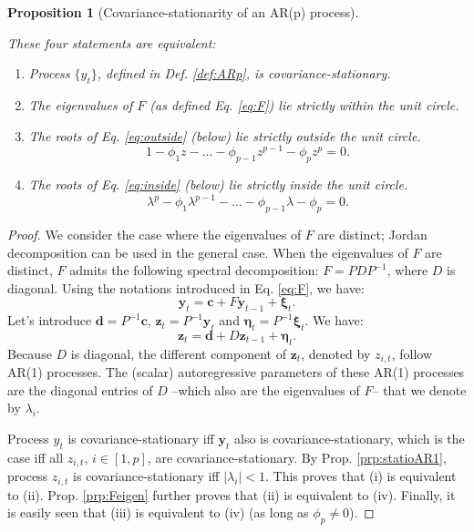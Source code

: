 \documentclass[
  12pt,
]{book}
\providecommand{\tightlist}{%
  \setlength{\itemsep}{0pt}\setlength{\parskip}{0pt}}
\newtheorem{proposition}{Proposition}[chapter]
\theoremstyle{definition}
\theoremstyle{definition}
\theoremstyle{definition}
\theoremstyle{definition}
\theoremstyle{remark}
\begin{document}
\begin{proposition}[Covariance-stationarity of an AR(p) process]
\protect\hypertarget{prp:stability}{}\label{prp:stability}

These four statements are equivalent:

\begin{enumerate}
\def\labelenumi{\roman{enumi}.}
\tightlist
\item
  Process \(\{y_t\}\), defined in Def. \ref{def:ARp}, is covariance-stationary.
\item
  The eigenvalues of \(F\) (as defined Eq. \eqref{eq:F}) lie strictly within the unit circle.
\item
  The roots of Eq. \eqref{eq:outside} (below) lie strictly outside the unit circle.
  \begin{equation}
  1 - \phi_1 z - \dots - \phi_{p-1}z^{p-1} - \phi_p z^p = 0.\label{eq:outside}
  \end{equation}
\item
  The roots of Eq. \eqref{eq:inside} (below) lie strictly inside the unit circle.
  \begin{equation}
  \lambda^p - \phi_1 \lambda^{p-1} - \dots - \phi_{p-1}\lambda - \phi_p = 0.\label{eq:inside}
  \end{equation}
\end{enumerate}

\end{proposition}

\begin{proof}
We consider the case where the eigenvalues of \(F\) are distinct; Jordan decomposition can be used in the general case. When the eigenvalues of \(F\) are distinct, \(F\) admits the following spectral decomposition: \(F = PDP^{-1}\), where \(D\) is diagonal. Using the notations introduced in Eq. \eqref{eq:F}, we have:
\[
\mathbf{y}_{t} = \mathbf{c} + F \mathbf{y}_{t-1} + \boldsymbol\xi_{t}.
\]
Let's introduce \(\mathbf{d} = P^{-1}\mathbf{c}\), \(\mathbf{z}_t = P^{-1}\mathbf{y}_t\) and \(\boldsymbol\eta_t = P^{-1}\boldsymbol\xi_t\). We have:
\[
\mathbf{z}_{t} = \mathbf{d} + D \mathbf{z}_{t-1} + \boldsymbol\eta_{t}.
\]
Because \(D\) is diagonal, the different component of \(\mathbf{z}_t\), denoted by \(z_{i,t}\), follow AR(1) processes. The (scalar) autoregressive parameters of these AR(1) processes are the diagonal entries of \(D\) --which also are the eigenvalues of \(F\)-- that we denote by \(\lambda_i\).

Process \(y_t\) is covariance-stationary iff \(\mathbf{y}_{t}\) also is covariance-stationary, which is the case iff all \(z_{i,t}\), \(i \in [1,p]\), are covariance-stationary. By Prop. \ref{prp:statioAR1}, process \(z_{i,t}\) is covariance-stationary iff \(|\lambda_i|<1\). This proves that (i) is equivalent to (ii). Prop. \ref{prp:Feigen} further proves that (ii) is equivalent to (iv). Finally, it is easily seen that (iii) is equivalent to (iv) (as long as \(\phi_p \ne 0\)).
\end{proof}
\end{document}
